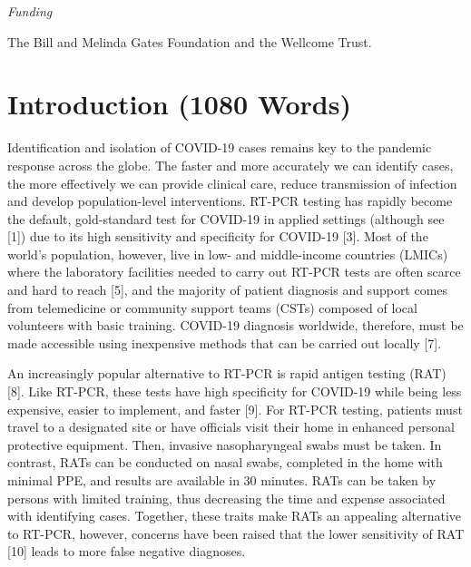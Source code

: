 \documentclass[]{elsarticle} %
\begin{document}
\emph{Funding}

The Bill and Melinda Gates Foundation and the Wellcome Trust.

\hypertarget{introduction-1080-words}{%
\section{Introduction (1080 Words)}\label{introduction-1080-words}}

Identification and isolation of COVID-19 cases remains key to the pandemic response across the globe.
The faster and more accurately we can identify cases, the more effectively we can provide clinical care, reduce transmission of infection and develop population-level interventions.
RT-PCR testing has rapidly become the default, gold-standard test for COVID-19 in applied settings (although see {[}1{]}) due to its high sensitivity and specificity for COVID-19 {[}3{]}.
Most of the world's population, however, live in low- and middle-income countries (LMICs) where the laboratory facilities needed to carry out RT-PCR tests are often scarce and hard to reach {[}5{]}, and the majority of patient diagnosis and support comes from telemedicine or community support teams (CSTs) composed of local volunteers with basic training.
COVID-19 diagnosis worldwide, therefore, must be made accessible using inexpensive methods that can be carried out locally {[}7{]}.

An increasingly popular alternative to RT-PCR is rapid antigen testing (RAT) {[}8{]}.
Like RT-PCR, these tests have high specificity for COVID-19 while being less expensive, easier to implement, and faster {[}9{]}.
For RT-PCR testing, patients must travel to a designated site or have officials visit their home in enhanced personal protective equipment.
Then, invasive nasopharyngeal swabs must be taken.
In contrast, RATs can be conducted on nasal swabs, completed in the home with minimal PPE, and results are available in 30 minutes.
RATs can be taken by persons with limited training, thus decreasing the time and expense associated with identifying cases.
Together, these traits make RATs an appealing alternative to RT-PCR, however, concerns have been raised that the lower sensitivity of RAT {[}10{]} leads to more false negative diagnoses.
\end{document}
